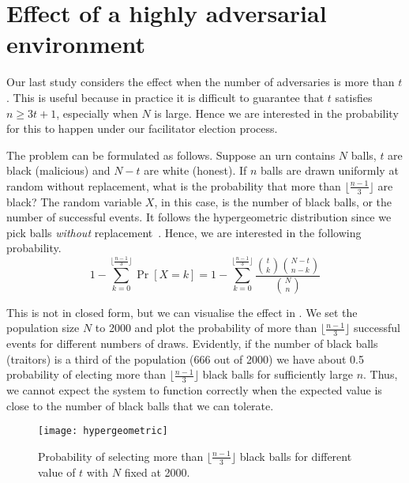 \section{Effect of a highly adversarial environment}
\label{sec:highly-adversarial}

Our last study considers the effect when the number of adversaries is more than $t$.
This is useful because in practice it is difficult to guarantee that $t$ satisfies $n \ge 3t + 1$,
especially when $N$ is large.
Hence we are interested in the probability for this to happen under our facilitator election process.

The problem can be formulated as follows.
Suppose an urn contains $N$ balls, $t$ are black (malicious) and $N-t$ are white (honest).
If $n$ balls are drawn uniformly at random without replacement,
what is the probability that more than $\lfloor \frac{n-1}{3} \rfloor$ are black?
The random variable $X$, in this case, is the number of black balls, or the number of successful events.
It follows the hypergeometric distribution since we pick balls \emph{without} replacement~\cite{skala2013hypergeometric}.
Hence, we are interested in the following probability.
$$
1 - \sum_{k = 0}^{\lfloor \frac{n-1}{3} \rfloor} \Pr[X = k] = 
1 - \sum_{k = 0}^{\lfloor \frac{n-1}{3} \rfloor} \frac{ \binom{t}{k} \binom{N-t}{n-k} }{ \binom{N}{n} }
$$

This is not in closed form,
but we can visualise the effect in .
We set the population size $N$ to 2000
and plot the probability of more than $\lfloor \frac{n-1}{3} \rfloor$ successful events for different numbers of draws.
Evidently,
if the number of black balls (traitors) is a third of the population (666 out of 2000)
we have about 0.5 probability of electing more than $\lfloor \frac{n-1}{3} \rfloor$ black balls for sufficiently large $n$.
Thus, we cannot expect the system to function correctly when 
the expected value is close to the number of black balls that we can tolerate.

\begin{figure}[h]
  \centering
  \texttt{[image: hypergeometric]}
  \caption{Probability of selecting more than $\lfloor \frac{n-1}{3} \rfloor$ black balls for
  different value of $t$ with $N$ fixed at 2000.}
  \label{fig:hypergeometric}
\end{figure}

